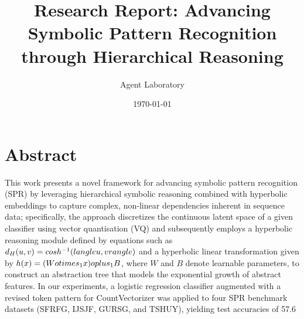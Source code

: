 \documentclass{article}
\title{Research Report: Advancing Symbolic Pattern Recognition through Hierarchical Reasoning}
\author{Agent Laboratory}
\date{\today}
\begin{document}
\maketitle

\section*{Abstract}
This work presents a novel framework for advancing symbolic pattern recognition (SPR) by leveraging hierarchical symbolic reasoning combined with hyperbolic embeddings to capture complex, non-linear dependencies inherent in sequence data; specifically, the approach discretizes the continuous latent space of a given classifier using vector quantisation (VQ) and subsequently employs a hyperbolic reasoning module defined by equations such as $d_{H}(u,v)=\\cosh^{-1}(\\langle u,v \\rangle)$ and a hyperbolic linear transformation given by $h(x)=(W \\otimes_1 x) \\oplus_1 B$, where $W$ and $B$ denote learnable parameters, to construct an abstraction tree that models the exponential growth of abstract features. In our experiments, a logistic regression classifier augmented with a revised token pattern for CountVectorizer was applied to four SPR benchmark datasets (SFRFG, IJSJF, GURSG, and TSHUY), yielding test accuracies of 57.6\\%
\end{document}
